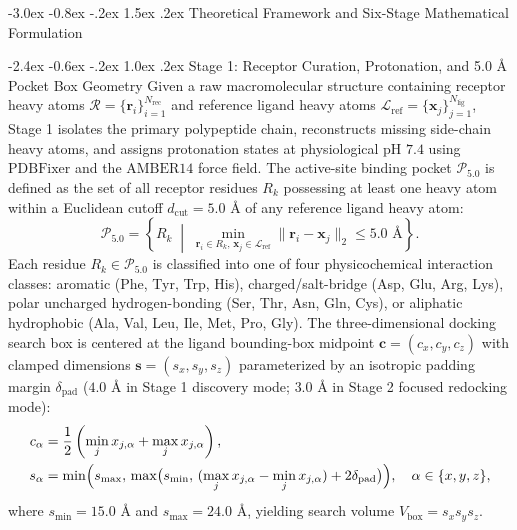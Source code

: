 \documentclass[11pt,a4paper]{article}
\makeatletter
\renewcommand{\section}{\@startsection{section}{1}{\z@}%
  {-3.0ex \@plus -0.8ex \@minus -.2ex}%
  {1.5ex \@plus.2ex}%
  {\normalfont\Large\bfseries\color{primary}}}
\renewcommand{\subsection}{\@startsection{subsection}{2}{\z@}%
  {-2.4ex \@plus -0.6ex \@minus -.2ex}%
  {1.0ex \@plus .2ex}%
  {\normalfont\large\bfseries\color{primary}}}
\makeatother
\begin{document}
\section{Theoretical Framework and Six-Stage Mathematical Formulation}

\subsection{Stage 1: Receptor Curation, Protonation, and 5.0 \AA{} Pocket Box Geometry}
\noindent Given a raw macromolecular structure containing receptor heavy atoms $\mathcal{R} = \{\mathbf{r}_i\}_{i=1}^{N_{\text{rec}}}$ and reference ligand heavy atoms $\mathcal{L}_{\text{ref}} = \{\mathbf{x}_j\}_{j=1}^{N_{\text{lig}}}$, Stage 1 isolates the primary polypeptide chain, reconstructs missing side-chain heavy atoms, and assigns protonation states at physiological $\text{pH }7.4$ using $\text{PDBFixer}$ and the $\text{AMBER14}$ force field. The active-site binding pocket $\mathcal{P}_{5.0}$ is defined as the set of all receptor residues $R_k$ possessing at least one heavy atom within a Euclidean cutoff $d_{\text{cut}} = 5.0\text{ \AA}$ of any reference ligand heavy atom:
\begin{equation}
\mathcal{P}_{5.0} = \left\{ R_k \;\middle|\; \min_{\mathbf{r}_i \in R_k,\, \mathbf{x}_j \in \mathcal{L}_{\text{ref}}} \|\mathbf{r}_i - \mathbf{x}_j\|_2 \le 5.0\text{ \AA} \right\}.
\label{eq:pocket}
\end{equation}
Each residue $R_k \in \mathcal{P}_{5.0}$ is classified into one of four physicochemical interaction classes: aromatic (Phe, Tyr, Trp, His), charged/salt-bridge (Asp, Glu, Arg, Lys), polar uncharged hydrogen-bonding (Ser, Thr, Asn, Gln, Cys), or aliphatic hydrophobic (Ala, Val, Leu, Ile, Met, Pro, Gly). The three-dimensional docking search box is centered at the ligand bounding-box midpoint $\mathbf{c} = (c_x, c_y, c_z)$ with clamped dimensions $\mathbf{s} = (s_x, s_y, s_z)$ parameterized by an isotropic padding margin $\delta_{\text{pad}}$ ($4.0\text{ \AA}$ in Stage 1 discovery mode; $3.0\text{ \AA}$ in Stage 2 focused redocking mode):
\begin{equation}
\begin{aligned}
c_\alpha &= \frac{1}{2}\left(\min_{j} x_{j,\alpha} + \max_{j} x_{j,\alpha}\right), \\
s_\alpha &= \min\Bigl(s_{\max},\, \max\bigl(s_{\min},\, (\max_{j} x_{j,\alpha} - \min_{j} x_{j,\alpha}) + 2\delta_{\text{pad}}\bigr)\Bigr), \quad \alpha \in \{x,y,z\},
\end{aligned}
\label{eq:box}
\end{equation}
where $s_{\min} = 15.0\text{ \AA}$ and $s_{\max} = 24.0\text{ \AA}$, yielding search volume $V_{\text{box}} = s_x s_y s_z$.
\end{document}
